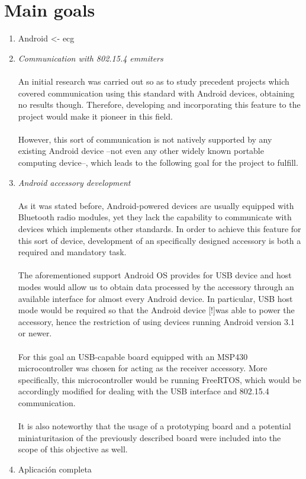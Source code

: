 	\section{Main goals}
		\begin{enumerate}
			\item Android <- ecg
			\item \emph{Communication with 802.15.4 emmiters}\\\\
				An initial research was carried out so as to study precedent projects which covered communication
				using this standard with Android devices, obtaining no results though. Therefore, developing and
				incorporating this feature to the project would make it pioneer in this field.\\\\
				However, this sort of communication is not natively supported by any existing Android device
				--not even any other widely known portable computing device--, which leads to the following goal
				for the project to fulfill.\\
			\item \emph{Android accessory development}\\\\
				As it was stated before, Android-powered devices are usually equipped with Bluetooth radio
				modules, yet they lack the capability to communicate with devices which implements other 
				standards. In order to achieve this feature for this sort of device, development of an
				specifically designed accessory is both a required and mandatory task.\\\\
				The aforementioned support Android OS provides for USB device and host modes would allow us to
				obtain data processed by the accessory through an available interface for almost every 
				Android device. In particular, USB host mode would be required so that the Android device 
				[!]was able to power the accessory, hence the restriction of using devices running %
				Android version 3.1 or newer.\\\\
				For this goal an USB-capable board equipped with an MSP430 microcontroller was chosen for acting
				as the receiver accessory. More specifically, this microcontroller would be running FreeRTOS,
				which would be accordingly modified for dealing with the USB interface and 802.15.4 
				communication.\\\\
				It is also noteworthy that the usage of a prototyping board and a potential miniaturitasion of
				the previously described board were included into the scope of this objective as well.\\
			\item Aplicación completa
		\end{enumerate}
